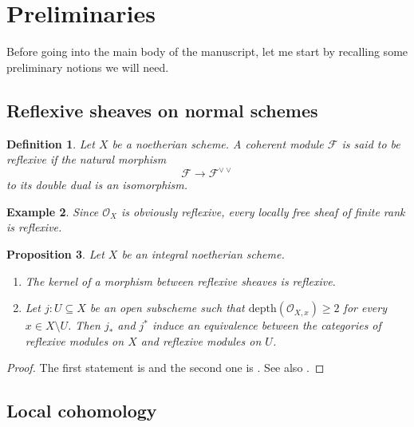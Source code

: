 \documentclass[a4paper,12pt]{amsart}
\newtheorem{definition}{Definition}[section]
\newtheorem{example}[definition]{Example}
\newtheorem{proposition}[definition]{Proposition}
\numberwithin{equation}{section}
\renewcommand{\geq}{\geqslant}
\renewcommand{\_}{\rule{0.25cm}{0.4pt}}
\begin{document}
\section{Preliminaries}\label{1}
Before going into the main body of the manuscript, let me start by recalling some preliminary notions we will need.

\subsection{Reflexive sheaves on normal schemes}\label{1.1}

\begin{definition}
    Let $X$ be a noetherian scheme. A coherent module $\mathcal{F}$ is said to be reflexive if the natural morphism
    \[
    \mathcal{F}\to \mathcal{F}^{\vee\vee}
    \]
    to its double dual is an isomorphism.
\end{definition}

\begin{example}
    Since $\mathcal{O}_{X}$ is obviously reflexive, every locally free sheaf of finite rank is reflexive.
\end{example}

\begin{proposition}\label{propriedades feixes reflexivos}
    Let $X$ be an integral noetherian scheme.
    \begin{enumerate}
        \item The kernel of a morphism between reflexive sheaves is reflexive.
        \item Let $j\colon U\subseteq X$ be an open subscheme such that $\text{depth}(\mathcal{O}_{X,x})\geq 2$ for every $x\in X\setminus U$. Then $j_{\ast}$ and $j^{\ast}$ induce an equivalence between the categories of reflexive modules on $X$ and reflexive modules on $U$.
    \end{enumerate}
\end{proposition}
\begin{proof}
    The first statement is \cite[\href{https://stacks.math.columbia.edu/tag/0EBG}{Tag 0EBG}]{stacks-project} and the second one is \cite[\href{https://stacks.math.columbia.edu/tag/0EBJ}{Tag 0EBJ}]{stacks-project}. See also \cite[Section 1]{Hartshorne1980-ps}.
\end{proof}

\subsection{Local cohomology}\label{1.2}
\end{document}
